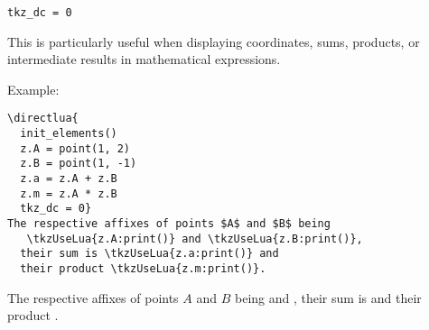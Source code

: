 \begin{verbatim}
tkz_dc = 0
\end{verbatim}

\medskip
\noindent
This is particularly useful when displaying coordinates, sums, products, or intermediate results in mathematical expressions.

\medskip
\noindent
Example:

\begin{verbatim}
\directlua{
  init_elements()
  z.A = point(1, 2)
  z.B = point(1, -1)
  z.a = z.A + z.B
  z.m = z.A * z.B
  tkz_dc = 0}
The respective affixes of points $A$ and $B$ being
   \tkzUseLua{z.A:print()} and \tkzUseLua{z.B:print()},
  their sum is \tkzUseLua{z.a:print()} and
  their product \tkzUseLua{z.m:print()}.
\end{verbatim}


The respective affixes of points $A$ and $B$ being
    and ,
  their sum is  and
  their product .
\endinput